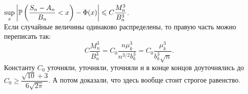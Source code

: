 \begin{Th}
    $\sup\limits_{x} \left| \mathbb{P} \left( \dfrac{S_n - A_n}{B_n} < x \right) - \Phi(x) \right| \leqslant C\dfrac{M_n^3}{B_n^3}$. \\
    Если случайные величины одинаково распределены, то правую часть можно переписать так:
    \[
    C \frac{M_n^3}{B_n^3} = C_0 \frac{n \mu_k^3}{n^{3/2} b_k^3} =
    C_0 \frac{\mu_k^3}{b_k^3 \sqrt{n}}
    .\] 
    Константу $C_0$ уточняли, уточняли, уточняли и в конце концов доуточнялись до $C_0 \geqslant \dfrac{\sqrt{10} + 3}{6 \sqrt{2 \pi}}$. А потом доказали, что здесь вообще стоит строгое равенство.
\end{Th}








\newpage

